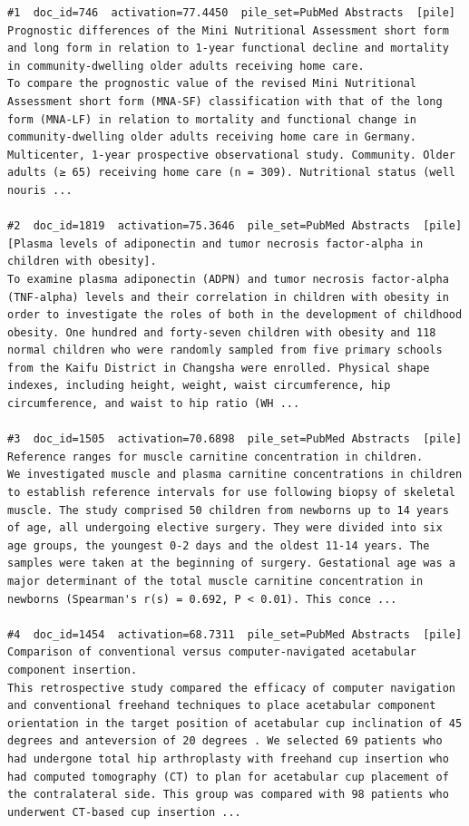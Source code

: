 \begin{verbatim}
#1  doc_id=746  activation=77.4450  pile_set=PubMed Abstracts  [pile]
Prognostic differences of the Mini Nutritional Assessment short form and long form in relation to 1-year functional decline and mortality in community-dwelling older adults receiving home care.
To compare the prognostic value of the revised Mini Nutritional Assessment short form (MNA-SF) classification with that of the long form (MNA-LF) in relation to mortality and functional change in community-dwelling older adults receiving home care in Germany. Multicenter, 1-year prospective observational study. Community. Older adults (≥ 65) receiving home care (n = 309). Nutritional status (well nouris ...

#2  doc_id=1819  activation=75.3646  pile_set=PubMed Abstracts  [pile]
[Plasma levels of adiponectin and tumor necrosis factor-alpha in children with obesity].
To examine plasma adiponectin (ADPN) and tumor necrosis factor-alpha (TNF-alpha) levels and their correlation in children with obesity in order to investigate the roles of both in the development of childhood obesity. One hundred and forty-seven children with obesity and 118 normal children who were randomly sampled from five primary schools from the Kaifu District in Changsha were enrolled. Physical shape indexes, including height, weight, waist circumference, hip circumference, and waist to hip ratio (WH ...

#3  doc_id=1505  activation=70.6898  pile_set=PubMed Abstracts  [pile]
Reference ranges for muscle carnitine concentration in children.
We investigated muscle and plasma carnitine concentrations in children to establish reference intervals for use following biopsy of skeletal muscle. The study comprised 50 children from newborns up to 14 years of age, all undergoing elective surgery. They were divided into six age groups, the youngest 0-2 days and the oldest 11-14 years. The samples were taken at the beginning of surgery. Gestational age was a major determinant of the total muscle carnitine concentration in newborns (Spearman's r(s) = 0.692, P < 0.01). This conce ...

#4  doc_id=1454  activation=68.7311  pile_set=PubMed Abstracts  [pile]
Comparison of conventional versus computer-navigated acetabular component insertion.
This retrospective study compared the efficacy of computer navigation and conventional freehand techniques to place acetabular component orientation in the target position of acetabular cup inclination of 45 degrees and anteversion of 20 degrees . We selected 69 patients who had undergone total hip arthroplasty with freehand cup insertion who had computed tomography (CT) to plan for acetabular cup placement of the contralateral side. This group was compared with 98 patients who underwent CT-based cup insertion ...


\end{verbatim}
